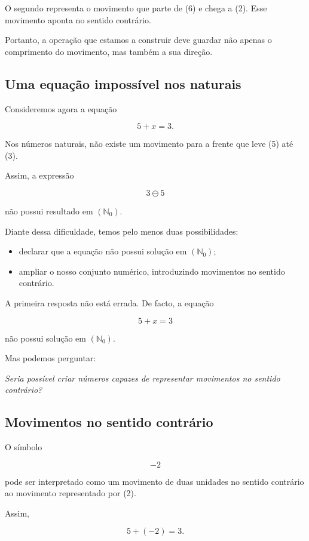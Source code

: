 \documentclass[12pt,a4paper]{article}
\begin{document}
O segundo representa o movimento que parte de (6) e chega a (2).
Esse movimento aponta no sentido contrário.

Portanto, a operação que estamos a construir deve guardar não apenas o
comprimento do movimento, mas também a sua direção.

\subsection{Uma equação impossível nos naturais}

Consideremos agora a equação

\[
5+x=3.
\]

Nos números naturais, não existe um movimento para a frente que leve
(5) até (3).

Assim, a expressão

\[
3\ominus5
\]

não possui resultado em $(\mathbb{N}_0)$.

Diante dessa dificuldade, temos pelo menos duas possibilidades:

\begin{itemize}
\item declarar que a equação não possui solução em
$(\mathbb{N}_0)$;
\item ampliar o nosso conjunto numérico, introduzindo movimentos no
sentido contrário.
\end{itemize}

A primeira resposta não está errada. De facto, a equação

\[
5+x=3
\]

não possui solução em $(\mathbb{N}_0)$.

Mas podemos perguntar:

\begin{center}
\emph{Seria possível criar números capazes de representar movimentos
no sentido contrário?}
\end{center}

\subsection{Movimentos no sentido contrário}

O símbolo

\[
-2
\]

pode ser interpretado como um movimento de duas unidades no sentido
contrário ao movimento representado por (2).

Assim,

\[
5+(-2)=3.
\]
\end{document}
